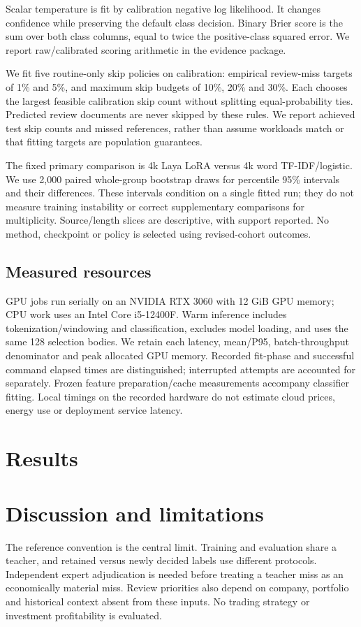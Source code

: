 \documentclass[11pt,a4paper]{article}
\begin{document}
Scalar temperature is fit by calibration negative log likelihood. It changes
confidence while preserving the default class decision. Binary Brier score is
the sum over both class columns, equal to twice the positive-class squared
error. We report raw/calibrated scoring arithmetic in the evidence package.

We fit five routine-only skip policies on calibration: empirical review-miss
targets of 1\% and 5\%, and maximum skip budgets of 10\%, 20\% and 30\%.
Each chooses the largest feasible calibration skip count without splitting
equal-probability ties. Predicted review documents are never skipped by these
rules. We report achieved test skip counts and missed references, rather than
assume workloads match or that fitting targets are population guarantees.

The fixed primary comparison is 4k Laya LoRA versus 4k word TF-IDF/logistic.
We use 2,000 paired whole-group bootstrap draws for percentile 95\% intervals
and their differences. These intervals condition on a single fitted run;
they do not measure training instability or correct supplementary comparisons
for multiplicity. Source/length slices are descriptive, with support reported.
No method, checkpoint or policy is selected using revised-cohort outcomes.

\subsection{Measured resources}
GPU jobs run serially on an NVIDIA RTX 3060 with 12 GiB GPU memory;
CPU work uses an Intel Core i5-12400F. Warm inference includes tokenization/windowing and
classification, excludes model loading, and uses the same 128 selection bodies.
We retain each latency, mean/P95, batch-throughput denominator and peak allocated
GPU memory. Recorded fit-phase and successful command elapsed times are distinguished;
interrupted attempts are accounted for separately.
Frozen feature preparation/cache measurements accompany classifier fitting.
Local timings on the recorded hardware do not estimate cloud prices, energy
use or deployment service latency.

\FloatBarrier
\section{Results}
\label{sec:results}


\section{Discussion and limitations}

The reference convention is the central limit. Training and evaluation share
a teacher, and retained versus newly decided labels use different protocols.
Independent expert adjudication is needed before treating a teacher miss as
an economically material miss. Review priorities also depend on company,
portfolio and historical context absent from these inputs. No trading strategy
or investment profitability is evaluated.
\end{document}
